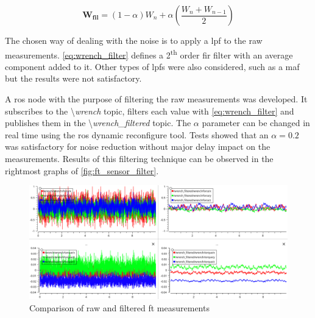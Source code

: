 \begin{equation}
    \mathbf{W_{fil}} = (1-\alpha)W_n + \alpha \left(\frac{W_n + W_{n-1}}{2}\right)
    \label{eq:wrench_filter}
\end{equation}


\par The chosen way of dealing with the noise is to apply a \ac{lpf} to the raw measurements. \autoref{eq:wrench_filter} defines a 2\textsuperscript{th} order \ac{fir} filter with an average component added to it. Other types of \acp{lpf} were also considered, such as a \ac{maf} but the results were not satisfactory.

\par A \ac{ros} node with the purpose of filtering the raw measurements was developed. It subscribes to the \textbackslash \textit{wrench} topic, filters each value with \autoref{eq:wrench_filter} and publishes them in the \textbackslash \textit{wrench\_filtered} topic. The $\alpha$ parameter can be changed in real time using the \ac{ros} dynamic reconfigure tool. Tests showed that an $\alpha = 0.2 $ was satisfactory for noise reduction without major delay impact on the measurements. Results of this filtering technique can be observed in the rightmost graphs of \autoref{fig:ft_sensor_filter}.

\begin{figure}[h]
    \centering
    \includegraphics[width=0.9\linewidth]{figs/chp3/ft_sensor_filter.png}
    \caption{Comparison of raw and filtered \ac{ft} measurements}
    \label{fig:ft_sensor_filter}
\end{figure}


